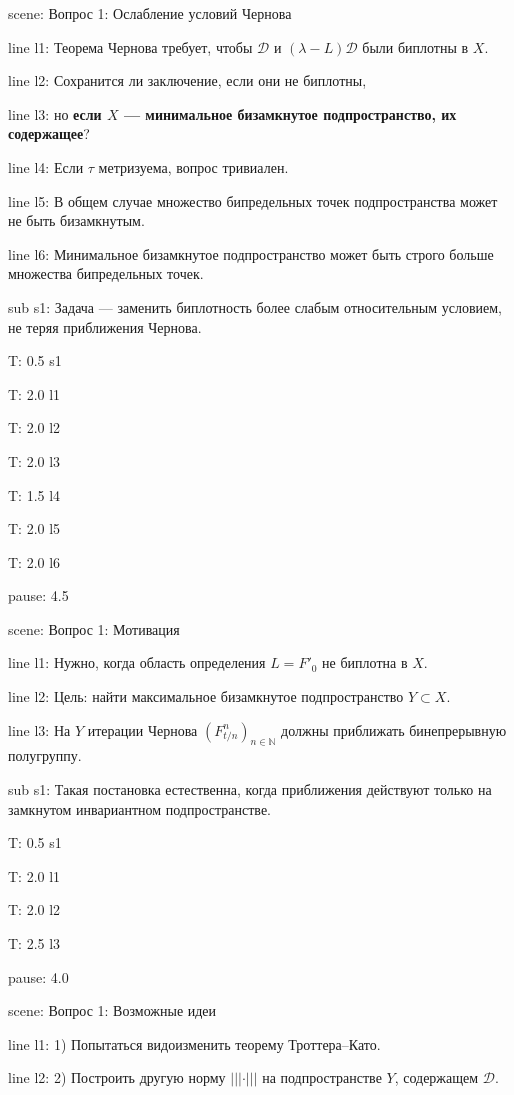 \documentclass[a4paper,11pt]{article}
\newcommand{\N}{\mathbb{N}}
\begin{document}
scene: {Вопрос 1: Ослабление условий Чернова}

line l1: {Теорема Чернова требует, чтобы $\mathcal{D}$ и $(\lambda-L)\mathcal{D}$ были биплотны в $X$.}

line l2: {Сохранится ли заключение, если они не биплотны,}

line l3: {но \textbf{если $X$ --- минимальное бизамкнутое подпространство, их содержащее}?}

line l4: {Если $\tau$ метризуема, вопрос тривиален.}

line l5: {В общем случае множество бипредельных точек подпространства может не быть бизамкнутым.}

line l6: {Минимальное бизамкнутое подпространство может быть строго больше множества бипредельных точек.}


sub s1: {Задача --- заменить биплотность более слабым относительным условием, не теряя приближения Чернова.}


T: 0.5 s1

T: 2.0 l1

T: 2.0 l2

T: 2.0 l3

T: 1.5 l4

T: 2.0 l5

T: 2.0 l6

pause: 4.5



scene: {Вопрос 1: Мотивация}

line l1: {Нужно, когда область определения $L=F'_0$ не биплотна в $X$.}

line l2: {Цель: найти максимальное бизамкнутое подпространство $Y\subset X$.}

line l3: {На $Y$ итерации Чернова $(F_{t/n}^n)_{n\in\N}$ должны приближать бинепрерывную полугруппу.}


sub s1: {Такая постановка естественна, когда приближения действуют только на замкнутом инвариантном подпространстве.}


T: 0.5 s1

T: 2.0 l1

T: 2.0 l2

T: 2.5 l3

pause: 4.0



scene: {Вопрос 1: Возможные идеи}

line l1: {1) Попытаться видоизменить теорему Троттера--Като.}

line l2: {2) Построить другую норму $|||\cdot|||$ на подпространстве $Y$, содержащем $\mathcal{D}$.}
\end{document}
